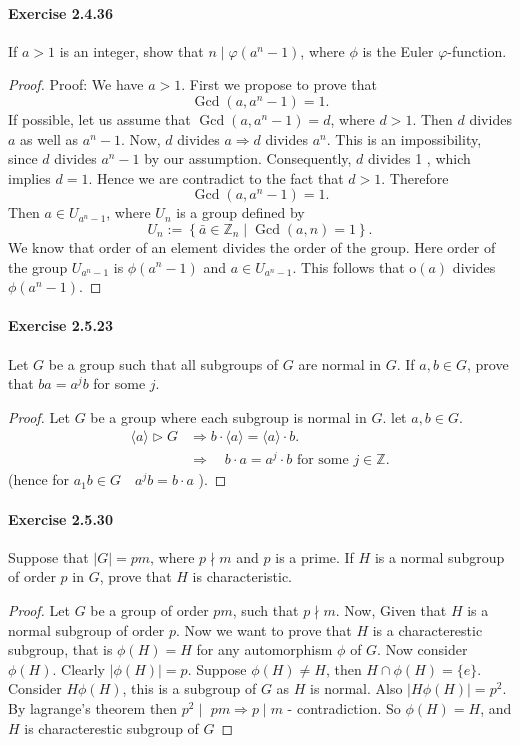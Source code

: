 \documentclass{article}
\begin{document}
\paragraph{Exercise 2.4.36} If $a > 1$ is an integer, show that $n \mid \varphi(a^n - 1)$, where $\phi$ is the Euler $\varphi$-function.
\begin{proof}
    Proof: We have $a>1$. First we propose to prove that
$$
\operatorname{Gcd}\left(a, a^n-1\right)=1 .
$$
If possible, let us assume that
$\operatorname{Gcd}\left(a, a^n-1\right)=d$, where $d>1$.
Then
$d$ divides $a$ as well as $a^n-1$.
Now,
$d$ divides $a \Longrightarrow d$ divides $a^n$.
This is an impossibility, since $d$ divides $a^n-1$ by our assumption. Consequently, $d$ divides 1 , which implies $d=1$. Hence we are contradict to the fact that $d>1$. Therefore
$$
\operatorname{Gcd}\left(a, a^n-1\right)=1 .
$$
Then $a \in U_{a^n-1}$, where $U_n$ is a group defined by
$$
U_n:=\left\{\bar{a} \in \mathbb{Z}_n \mid \operatorname{Gcd}(a, n)=1\right\} .
$$
We know that order of an element divides the order of the group. Here order of the group $U_{a^n-1}$ is $\phi\left(a^n-1\right)$ and $a \in U_{a^n-1}$. This follows that $\mathrm{o}(a)$ divides $\phi\left(a^n-1\right)$.
\end{proof}


\paragraph{Exercise 2.5.23} Let $G$ be a group such that all subgroups of $G$ are normal in $G$. If $a, b \in G$, prove that $ba = a^jb$ for some $j$.
\begin{proof}
    Let $G$ be a group where each subgroup is normal in $G$. let $a, b \in G$.
$$
\begin{aligned}
    \langle a\rangle\triangleright  G  &\Rightarrow b \cdot\langle a\rangle=\langle a\rangle \cdot b . \\
& \Rightarrow \quad b \cdot a=a^j \cdot b \text { for some } j \in \mathbb{Z}.
\end{aligned}
$$
(hence for $a_1 b \in G \quad a^j b=b \cdot a$ ).
\end{proof}



\paragraph{Exercise 2.5.30} Suppose that $|G| = pm$, where $p \nmid m$ and $p$ is a prime. If $H$ is a normal subgroup of order $p$ in $G$, prove that $H$ is characteristic.
\begin{proof}
    Let $G$ be a group of order $p m$, such that $p \nmid m$. Now, Given that $H$ is a normal subgroup of order $p$. Now we want to prove that $H$ is a characterestic subgroup, that is $\phi(H)=H$ for any automorphism $\phi$ of $G$. Now consider $\phi(H)$. Clearly $|\phi(H)|=p$. Suppose $\phi(H) \neq H$, then $H \cap \phi (H)=\{ e\}$. Consider $H \phi(H)$, this is a subgroup of $G$ as $H$ is normal. Also $|H \phi(H)|=p^2$. By lagrange's theorem then $p^2 \mid$ $p m \Longrightarrow p \mid m$ - contradiction. So $\phi(H)=H$, and $H$ is characterestic subgroup of $G$
\end{proof}
\end{document}
